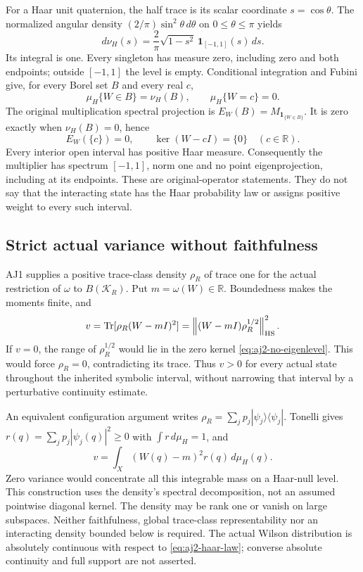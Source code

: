 For a Haar unit quaternion, the half trace is its scalar coordinate $s=\cos\theta$. The normalized angular density $(2/\pi)\sin^2\theta\,d\theta$ on $0\le\theta\le\pi$ yields
\begin{equation}
 d\nu_H(s)=\frac2\pi\sqrt{1-s^2}\,
             \mathbf1_{[-1,1]}(s)\,ds.
 \label{eq:aj2-haar-law}
\end{equation}
Its integral is one. Every singleton has measure zero, including zero and both endpoints; outside $[-1,1]$ the level is empty. Conditional integration and Fubini give, for every Borel set $B$ and every real $c$,
\begin{equation}
 \mu_H\{W\in B\}=\nu_H(B),\qquad
 \mu_H\{W=c\}=0.
 \label{eq:aj2-null-levels}
\end{equation}
The original multiplication spectral projection is $E_W(B)=M_{\mathbf1_{\{W\in B\}}}$. It is zero exactly when $\nu_H(B)=0$, hence
\begin{equation}
 E_W(\{c\})=0,
 \qquad\ker(W-cI)=\{0\}\quad(c\in\mathbb R).
 \label{eq:aj2-no-eigenlevel}
\end{equation}
Every interior open interval has positive Haar measure. Consequently the multiplier has spectrum $[-1,1]$, norm one and no point eigenprojection, including at its endpoints. These are original-operator statements. They do not say that the interacting state has the Haar probability law or assigns positive weight to every such interval.

\subsection{Strict actual variance without faithfulness}
AJ1 supplies a positive trace-class density $\rho_R$ of trace one for the actual restriction of $\omega$ to $B(\mathcal K_R)$. Put $m=\omega(W)\in\mathbb R$. Boundedness makes the moments finite, and
\begin{equation}
 v=\operatorname{Tr}[\rho_R(W-mI)^2]
   =\left\lVert(W-mI)\rho_R^{1/2}\right\rVert_{\rm HS}^2.
 \label{eq:aj2-variance}
\end{equation}
If $v=0$, the range of $\rho_R^{1/2}$ would lie in the zero kernel \eqref{eq:aj2-no-eigenlevel}. This would force $\rho_R=0$, contradicting its trace. Thus $v>0$ for every actual state throughout the inherited symbolic interval, without narrowing that interval by a perturbative continuity estimate.

An equivalent configuration argument writes $\rho_R=\sum_jp_j|\psi_j\rangle\langle\psi_j|$. Tonelli gives $r(q)=\sum_jp_j|\psi_j(q)|^2\ge0$ with $\int r\,d\mu_H=1$, and
\begin{equation}
 v=\int_X(W(q)-m)^2r(q)\,d\mu_H(q).
\end{equation}
Zero variance would concentrate all this integrable mass on a Haar-null level. This construction uses the density's spectral decomposition, not an assumed pointwise diagonal kernel. The density may be rank one or vanish on large subspaces. Neither faithfulness, global trace-class representability nor an interacting density bounded below is required. The actual Wilson distribution is absolutely continuous with respect to \eqref{eq:aj2-haar-law}; converse absolute continuity and full support are not asserted.


